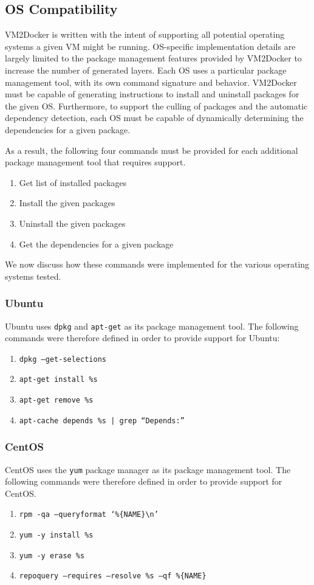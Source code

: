 \subsection{OS Compatibility}
VM2Docker is written with the intent of supporting all potential operating systems a given VM might be running. OS-specific implementation details are largely limited to the package management features provided by VM2Docker to increase the number of generated layers. Each OS uses a particular package management tool, with its own command signature and behavior. VM2Docker must be capable of generating instructions to install and uninstall packages for the given OS. Furthermore, to support the culling of packages and the automatic dependency detection, each OS must be capable of dynamically determining the dependencies for a given package.

As a result, the following four commands must be provided for each additional package management tool that requires support. 
\begin{enumerate}
\item Get list of installed packages
\item Install the given packages
\item Uninstall the given packages
\item Get the dependencies for a given package
\end{enumerate}

We now discuss how these commands were implemented for the various operating systems tested.

\subsubsection{Ubuntu}
Ubuntu uses \texttt{dpkg} and \texttt{apt-get} as its package management tool. The following commands were therefore defined in order to provide support for Ubuntu:
\begin{enumerate}
\item \texttt{dpkg --get-selections}
\item \texttt{apt-get install \%s}
\item \texttt{apt-get remove \%s}
\item \texttt{apt-cache depends \%s | grep ``Depends:''}
\end{enumerate}
\subsubsection{CentOS}
CentOS uses the \texttt{yum} package manager as its package management tool. The following commands were therefore defined in order to provide support for CentOS.
\begin{enumerate}
\item \texttt{rpm -qa --queryformat `\%\{NAME\}\textbackslash n'}
\item \texttt{yum -y install \%s}
\item \texttt{yum -y erase \%s}
\item \texttt{repoquery --requires --resolve \%s --qf \%\{NAME\}}
\end{enumerate}

